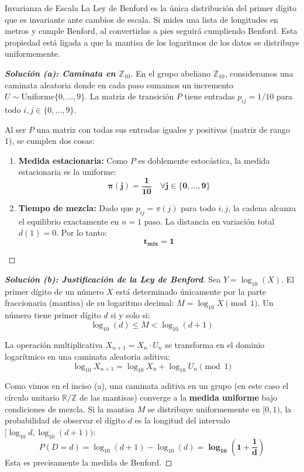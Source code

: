 \documentclass[10pt,a4paper]{article}
\begin{document}
\vspace{2mm}

\begin{nota}{Invarianza de Escala}
    La Ley de Benford es la única distribución del primer dígito que es invariante ante cambios de escala. Si mides una lista de longitudes en metros y cumple Benford, al convertirlas a pies seguirá cumpliendo Benford. Esta propiedad está ligada a que la mantisa de los logaritmos de los datos se distribuye uniformemente.
\end{nota}

\begin{proof}[\textbf{Solución (a): Caminata en $\mathbb{Z}_{10}$}]
    En el grupo abeliano $\mathbb{Z}_{10}$, consideramos una caminata aleatoria donde en cada paso sumamos un incremento $U \sim \text{Uniforme}\{0, \dots, 9\}$. La matriz de transición $P$ tiene entradas $p_{ij} = 1/10$ para todo $i, j \in \{0, \dots, 9\}$. 
    
    Al ser $P$ una matriz con todas sus entradas iguales y positivas (matriz de rango 1), se cumplen dos cosas:
    \begin{enumerate}
        \item \textbf{Medida estacionaria:} Como $P$ es doblemente estocástica, la medida estacionaria es la uniforme:
        \[ \mathbf{\pi(j) = \frac{1}{10} \quad \forall j \in \{0, \dots, 9\}} \]
        \item \textbf{Tiempo de mezcla:} Dado que $p_{ij} = \pi(j)$ para todo $i, j$, la cadena alcanza el equilibrio exactamente en $n=1$ paso. La distancia en variación total $d(1) = 0$. Por lo tanto:
        \[ \mathbf{t_{\text{mix}} = 1} \]
    \end{enumerate}
\end{proof}

\vspace{5mm}

\begin{proof}[\textbf{Solución (b): Justificación de la Ley de Benford}]
    Sea $Y = \log_{10}(X)$. El primer dígito de un número $X$ está determinado únicamente por la parte fraccionaria (mantisa) de su logaritmo decimal: $M = \log_{10} X \pmod 1$. 
    Un número tiene primer dígito $d$ si y solo si:
    \[ \log_{10}(d) \le M < \log_{10}(d+1) \]
    
    La operación multiplicativa $X_{n+1} = X_n \cdot U_n$ se transforma en el dominio logarítmico en una caminata aleatoria aditiva:
    \[ \log_{10} X_{n+1} = \log_{10} X_n + \log_{10} U_n \pmod 1 \]
    
    Como vimos en el inciso (a), una caminata aditiva en un grupo (en este caso el círculo unitario $\mathbb{R}/\mathbb{Z}$ de las mantisas) converge a la \textbf{medida uniforme} bajo condiciones de mezcla. Si la mantisa $M$ se distribuye uniformemente en $[0, 1)$, la probabilidad de observar el dígito $d$ es la longitud del intervalo $[\log_{10} d, \log_{10}(d+1))$:
    \[ P(D=d) = \log_{10}(d+1) - \log_{10}(d) = \mathbf{\log_{10}\left( 1 + \frac{1}{d} \right)} \]
    Esta es precisamente la medida de Benford.
\end{proof}
\end{document}
